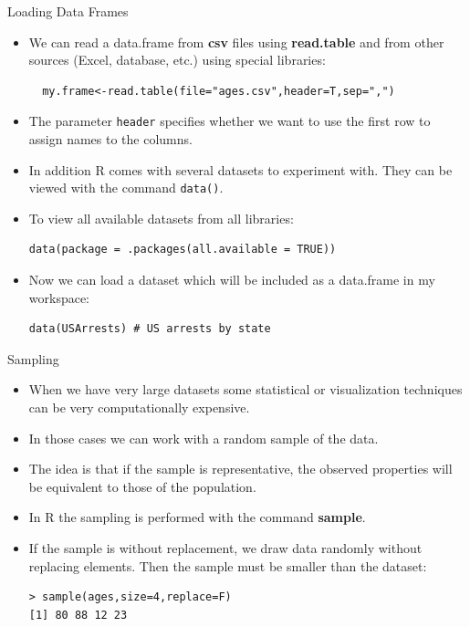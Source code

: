 \documentclass[handout]{beamer}
\begin{document}
\begin{frame}[fragile]{Loading Data Frames}
\scriptsize{
\begin{itemize}
 \item We can read a data.frame from \textbf{csv} files using \textbf{read.table} and from other sources (Excel, database, etc.) using special libraries:
 \begin{verbatim}
  my.frame<-read.table(file="ages.csv",header=T,sep=",")
 \end{verbatim}
\item The parameter \verb+header+ specifies whether we want to use the first row to assign names to the columns.

\item In addition R comes with several datasets to experiment with. They can be viewed with the command \verb+data()+.

\item To view all available datasets from all libraries:
\begin{verbatim}
data(package = .packages(all.available = TRUE)) 
\end{verbatim}

\item Now we can load a dataset which will be included as a data.frame in my workspace:
\begin{verbatim}
data(USArrests) # US arrests by state 
\end{verbatim}

 
\end{itemize}



}
\end{frame}



\begin{frame}[fragile]{Sampling}
\scriptsize{
\begin{itemize}
 \item When we have very large datasets some statistical or visualization techniques can be very computationally expensive. 
 \item  In those cases we can work with a random sample of the data. 
 
 \item The idea is that if the sample is representative, the observed properties will be equivalent to those of the population.   
 
 \item In R the sampling is performed with the command \textbf{sample}.
 
 \item If the sample is without replacement, we draw data randomly without replacing elements. Then the sample must be smaller than the dataset:

 \begin{verbatim}
> sample(ages,size=4,replace=F)
[1] 80 88 12 23
\end{verbatim}
\end{itemize}



}
\end{frame}
\end{document}
